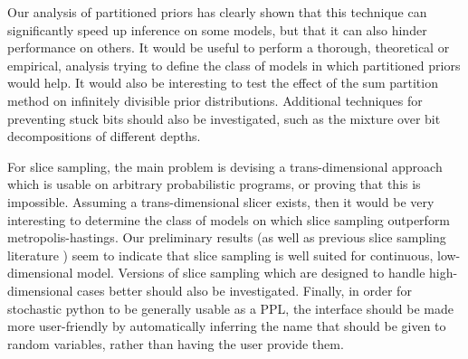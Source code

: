 Our analysis of partitioned priors has clearly shown that this technique can significantly speed up inference on some models, but that it can also hinder performance on others. It would be useful to perform a thorough, theoretical or empirical, analysis trying to define the class of models in which partitioned priors would help. It would also be interesting to test the effect of the sum partition method on infinitely divisible prior distributions. Additional techniques for preventing stuck bits should also be investigated, such as the mixture over bit decompositions of different depths. 

For slice sampling, the main problem is devising a trans-dimensional approach which is usable on arbitrary probabilistic programs, or proving that this is impossible. Assuming a trans-dimensional slicer exists, then it would be very interesting to determine the class of models on which slice sampling outperform metropolis-hastings. Our preliminary results (as well as previous slice sampling literature \cite{}) seem to indicate that slice sampling is well suited for continuous, low-dimensional model. Versions of slice sampling which are designed to handle high-dimensional cases better should also be investigated. Finally, in order for stochastic python to be generally usable as a PPL, the interface should be made more user-friendly by automatically inferring the name that should be given to random variables, rather than having the user provide them.



